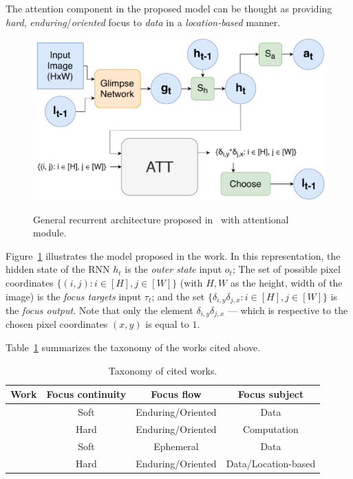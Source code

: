 \documentclass[11pt]{article}
\begin{document}
The attention component in the proposed model can be thought as providing
\emph{hard}, \emph{enduring}/\emph{oriented} focus to \emph{data} in a \emph{location-based} manner.

\begin{figure}[H]
    \centering
    \includegraphics[width=0.7\linewidth]{./img/ram.pdf}\label{fig:ram}
    \caption{General recurrent architecture proposed in~\cite{ref:ram} with attentional module.}
\end{figure}

Figure~\ref{fig:ram} illustrates the model proposed in the work.
In this representation, the hidden state of the RNN $h_t$ is the \emph{outer state} input $o_t$;
The set of possible pixel coordinates $\{(i, j): i \in [H], j \in [W]\}$ (with $H, W$ as the height, width of the image)
is the \emph{focus targets} input $\tau_t$;
and the set $\{\delta_{i, y}\delta_{j, x}: i \in [H], j \in [W]\}$ is the \emph{focus output}.
Note that only the element $\delta_{i, y}\delta_{j,x}$ --- which is respective to the chosen pixel coordinates $(x, y)$
is equal to $1$.

Table~\ref{tab:tx} summarizes the taxonomy of the works cited above.
\begin{table}[H]
\centering
\caption{\small Taxonomy of cited works.}
\begin{tabular}{|c|c|c|c|}
	\hline
     Work & Focus continuity & Focus flow & Focus subject\\
    \hline
     \cite{ref:show-attend-tell} & Soft & Enduring/Oriented & Data\\
    \hline
     \cite{ref:act} & Hard & Enduring/Oriented & Computation\\
    \hline
     \cite{ref:act} & Soft & Ephemeral & Data\\
    \hline
     \cite{ref:ram} & Hard & Enduring/Oriented & Data/Location-based\\
    \hline
\end{tabular}
\label{tab:tx}
\end{table}

\printbibliography
\end{document}
